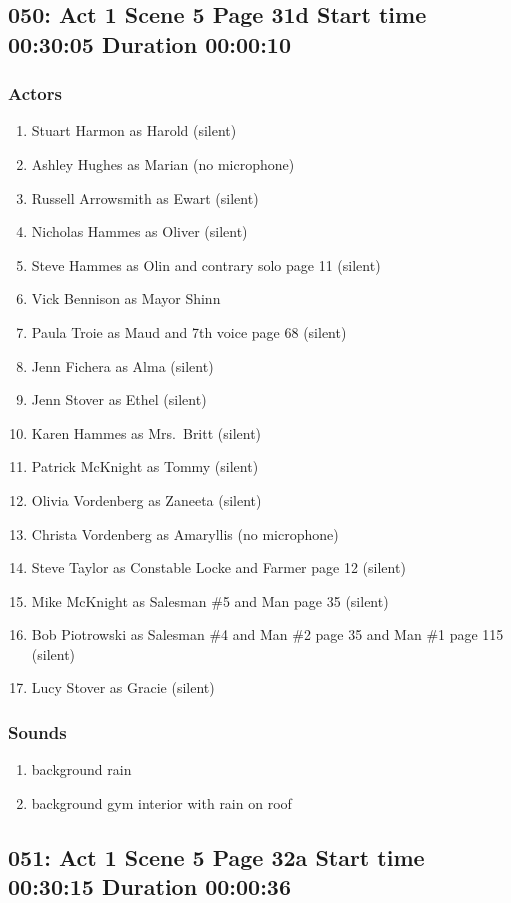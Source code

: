 \subsection{050: Act 1 Scene 5 Page 31d Start time 00:30:05 Duration 00:00:10}

\subsubsection{Actors}
\begin{enumerate}
\item Stuart Harmon as Harold (silent)
\item Ashley Hughes as Marian (no microphone)
\item Russell Arrowsmith as Ewart (silent)
\item Nicholas Hammes as Oliver (silent)
\item Steve Hammes as Olin and contrary solo page 11 (silent)
\item Vick Bennison as Mayor Shinn
\item Paula Troie as Maud and 7th voice page 68 (silent)
\item Jenn Fichera as Alma (silent)
\item Jenn Stover as Ethel (silent)
\item Karen Hammes as Mrs.~Britt (silent)
\item Patrick McKnight as Tommy (silent)
\item Olivia Vordenberg as Zaneeta (silent)
\item Christa Vordenberg as Amaryllis (no microphone)
\item Steve Taylor as Constable Locke and Farmer page 12 (silent)
\item Mike McKnight as Salesman \#5 and Man page 35 (silent)
\item Bob Piotrowski as Salesman \#4 and Man \#2 page 35 and Man \#1 page 115 (silent)
\item Lucy Stover as Gracie (silent)
\end{enumerate}

\subsubsection{Sounds}
\begin{enumerate}
\item background rain
\item background gym interior with rain on roof
\end{enumerate}
\subsection{051: Act 1 Scene 5 Page 32a Start time 00:30:15 Duration 00:00:36}

